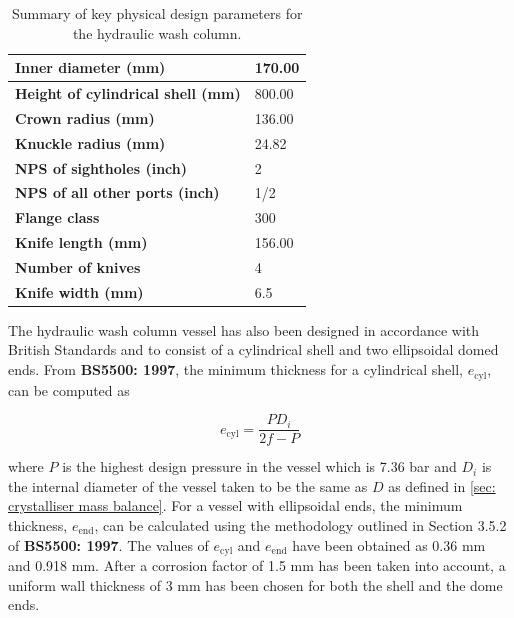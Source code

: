 \begin{table}
\centering
\caption{Summary of key physical design parameters for the hydraulic wash column.}
\label{tab:wash column mech design summary}
\begin{tabular}{@{}l|l@{}}
\toprule
\textbf{Inner diameter (mm)}                &    170.00 \\ \midrule
\textbf{Height of cylindrical shell (mm)}   & 800.00 \\ \midrule
\textbf{Crown radius (mm)}                  & 136.00 \\ \midrule
\textbf{Knuckle radius (mm)}                & 24.82  \\ \midrule
\textbf{NPS of sightholes (inch)}                & 2 \\ \midrule
\textbf{NPS of all other ports (inch)}                & 1/2 \\ \midrule
\textbf{Flange class}                       & 300 \\ \midrule
\textbf{Knife length (mm)}              & 156.00 \\ \midrule
\textbf{Number of knives}            & 4 \\ \midrule
\textbf{Knife width (mm)}          & 6.5 \\ \bottomrule
\end{tabular}
\end{table}
The hydraulic wash column vessel has also been designed in accordance with British Standards and to consist of a cylindrical shell and two ellipsoidal domed ends. From \textbf{BS5500: 1997}, the minimum thickness for a cylindrical shell, $e_{\mathrm{cyl}}$, can be computed as 

\begin{equation}
    e_{\mathrm{cyl}} = \frac{P D_i}{2f - P}
\end{equation}

\noindent where $P$ is the highest design pressure in the vessel which is 7.36 bar and $D_i$ is the internal diameter of the vessel taken to be the same as $D$ as defined in \cref{sec: crystalliser mass balance}. For a vessel with ellipsoidal ends, the minimum thickness, $e_{\mathrm{end}}$, can be calculated using the methodology outlined in Section 3.5.2 of \textbf{BS5500: 1997}. The values of $e_{\mathrm{cyl}}$ and $e_{\mathrm{end}}$ have been obtained as 0.36 mm and 0.918 mm. After a corrosion factor of 1.5 mm has been taken into account, a uniform wall thickness of 3 mm has been chosen for both the shell and the dome ends. 

